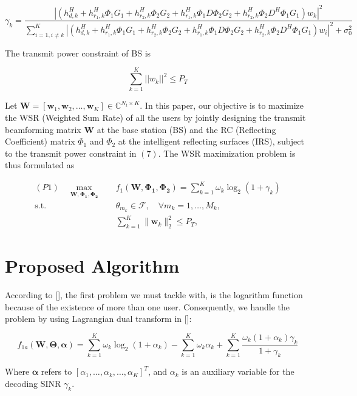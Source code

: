 \documentclass[review]{elsarticle}
\begin{document}
		\[
			\gamma_k = \frac{{\left|\left(h_{d,k}^H + h_{r_1,k}^H \Phi_1 G_1 + h_{r_2,k}^H \Phi_2 G_2 + h_{r_1,k}^H \Phi_1 D \Phi_2 G_2 + h_{r_2,k}^H \Phi_2 D^H \Phi_1 G_1 \right)w_k\right|^2}}{{\sum_{i=1,i\neq k}^{K} \left|\left(h_{d,k}^H + h_{r_1,k}^H \Phi_1 G_1 + h_{r_2,k}^H \Phi_2 G_2 + h_{r_1,k}^H \Phi_1 D \Phi_2 G_2 + h_{r_2,k}^H \Phi_2 D^H \Phi_1 G_1 \right)w_i\right|^2 + \sigma^2_0}}
		\]
			
		The transmit power constraint of BS is
		
		\[
			\sum_{k=1}^{K} ||w_k||^2 \leq P_T
		\]
		
		Let $\mathbf{W} = [\mathbf{w}_1, \mathbf{w}_2, \ldots, \mathbf{w}_K] \in \mathbb{C}^{N_t \times K}$. In this paper, our objective is to maximize the WSR (Weighted Sum Rate) of all the users by jointly designing the transmit beamforming matrix $\mathbf{W}$ at the base station (BS) and the RC (Reflecting Coefficient) matrix $\Phi_1$ and $\Phi_2$ at the intelligent reflecting surfaces (IRS), subject to the transmit power constraint in $(7)$. The WSR maximization problem is thus formulated as
		
		\begin{align*}
			(P1) \quad \max_{\mathbf{W}, \boldsymbol{\Phi_1}, \boldsymbol{\Phi_2}} \quad & f_1(\mathbf{W}, \boldsymbol{\Phi_1}, \boldsymbol{\Phi_2}) = \sum_{k=1}^{K} \omega_k \log_2(1 + \gamma_k) \\
			\text{s.t.} \quad & \theta_{m_k} \in \mathcal{F}, \quad \forall m_k = 1, \ldots, M_k, \tag{8a} \\
			& \sum_{k=1}^{K} \| \mathbf{w}_k \|_2^2 \leq P_T,
		\end{align*}
	
	\section{Proposed Algorithm}
		According to [], the first problem we must tackle with, is the logarithm function because of the existence of more than one user.
		Consequently, we handle the problem by using Lagrangian dual transform in []:
	
		\[
		f_{1a}(\mathbf{W}, \boldsymbol{\Theta}, \boldsymbol{\alpha}) = \sum_{k=1}^{K} \omega_k \log_2(1 + \alpha_k) - \sum_{k=1}^{K} \omega_k \alpha_k + \sum_{k=1}^{K} \frac{\omega_k (1 + \alpha_k) \gamma_k}{1 + \gamma_k}
		\]
		
		Where $\boldsymbol{\alpha}$ refers to $[\alpha_1, \ldots, \alpha_k, \ldots, \alpha_K]^T$, and $\alpha_k$ is an auxiliary variable for the decoding SINR $\gamma_k$.
		
\end{document}
